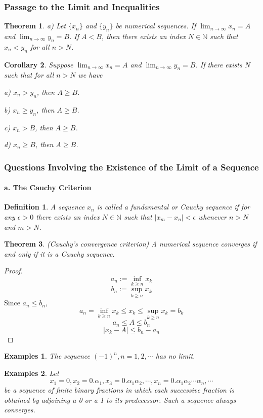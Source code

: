 \documentclass[a4paper,12pt]{article} %
\newtheorem{definition}{Definition}[section]
\newtheorem{theorem}{Theorem}[section]
\newtheorem{corollary}[theorem]{Corollary}
\newtheorem{example}{Examples}
\begin{document}
\subsubsection{Passage to the Limit and Inequalities}
\begin{theorem}
    {\rm a) } Let $\{x_n\}$ and $\{y_n\}$ be numerical sequences. If $\displaystyle \lim_{n\to \infty}
    x_n =A$ and $\displaystyle \lim_{n\to \infty} y_n =B$. If $A < B$, then there exists an 
    index $N \in \mathbb{N}$ such that $x_n < y_n$  for all $n > N$.
\end{theorem}
\begin{corollary}
    Suppose $\displaystyle \lim_{n\to \infty}
    x_n =A$ and $\displaystyle \lim_{n\to \infty} y_n =B$.
    If there exists $N$ such that for all $n > N$ we have 

    {\rm a)} $x_n > y_n$, then $A \ge B$.

    {\rm b)} $x_n \ge y_n$, then $A \ge B$.

    {\rm c)} $x_n > B$, then $A \ge B$.

    {\rm d)} $x_n \ge B$, then $A \ge B$.
\end{corollary}

\subsubsection{Questions Involving the Existence of the Limit of a Sequence}
\paragraph{{\rm \textbf{ a. The Cauchy Criterion}}}
\begin{definition}
    A sequence ${x_n}$ is called a \textit{fundamental or Cauchy} sequence 
    if for any $\epsilon > 0$ there exists an index $N \in \mathbb{N}$
    such that $|x_m - x_n| < \epsilon$ whenever $n > N$ and $m > N$.
\end{definition}
\begin{theorem}{(Cauchy's convergence criterion)}
    A numerical sequence converges if and only if it is a Cauchy sequence.
\end{theorem}
\begin{proof}
    \[a_n := \inf_{k\ge n} x_k\]
    \[b_n:= \sup_{k\ge n} x_k\]
    Since $a_n \le b_n$, 
    \[a_n = \inf_{k\ge n} x_k \le x_k \le \sup_{k\ge n} x_k = b_k\]
    \[a_n \le A \le b_n\]
    \[\left|x_k - A\right| \le b_n - a_n\]
\end{proof}
\begin{example}
    The sequence $(-1)^n, n = 1,2,\cdots$ has no limit.
\end{example}
\begin{example}
    Let \[x_1 = 0, x_2 = 0.\alpha_1, x_3 = 0.\alpha_1\alpha_2, \cdots, x_n = 0.\alpha_1\alpha_2\cdots\alpha_n, \cdots\]
    be a sequence of finite binary fractions in which each successive
    fraction is obtained by adjoining a 0 or a 1 to its predecessor. 
    Such a sequence always converges.
\end{example}
\end{document}

